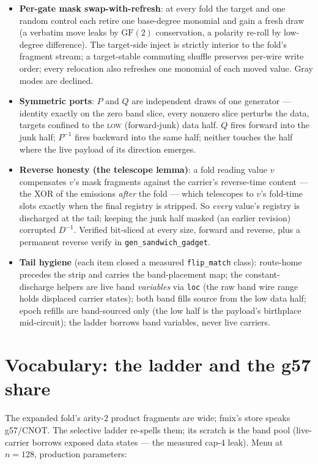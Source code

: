 \documentclass[11pt]{article}
\begin{document}
\begin{itemize}
\item \textbf{Per-gate mask swap-with-refresh}: at every fold the target
and one random control each retire one base-degree monomial and gain a
fresh draw (a verbatim move leaks by $\mathrm{GF}(2)$ conservation, a
polarity re-roll by low-degree difference). The target-side inject is
strictly interior to the fold's fragment stream; a target-stable
commuting shuffle preserves per-wire write order; every relocation also
refreshes one monomial of each moved value. Gray modes are declined.
\item \textbf{Symmetric ports}: $P$ and $Q$ are independent draws of one
generator --- identity exactly on the zero band slice, every nonzero
slice perturbs the data, targets confined to the \textsc{low}
(forward-junk) data half. $Q$ fires forward into the junk half; $P^{-1}$
fires backward into the same half; neither touches the half where the
live payload of its direction emerges.
\item \textbf{Reverse honesty (the telescope lemma)}: a fold reading
value $v$ compensates $v$'s mask fragments against the carrier's
reverse-time content --- the XOR of the emissions \emph{after} the fold
--- which telescopes to $v$'s fold-time slots exactly when the final
registry is stripped. So \emph{every} value's registry is discharged at
the tail; keeping the junk half masked (an earlier revision) corrupted
$D^{-1}$. Verified bit-sliced at every size, forward and reverse, plus a
permanent reverse verify in \texttt{gen\_sandwich\_gadget}.
\item \textbf{Tail hygiene} (each item closed a measured
\texttt{flip\_match} class): route-home precedes the strip and carries
the band-placement map; the constant-discharge helpers are live band
\emph{variables} via \texttt{loc} (the raw band wire range holds
displaced carrier states); both band fills source from the low data
half; epoch refills are band-sourced only (the low half is the payload's
birthplace mid-circuit); the ladder borrows band variables, never live
carriers.
\end{itemize}

\section{Vocabulary: the ladder and the g57 share}

The expanded fold's arity-2 product fragments are wide; fmix's store
speaks g57/CNOT. The selective ladder re-spells them; its scratch is the
band pool (live-carrier borrows exposed data states --- the measured
cap-4 leak). Menu at $n=128$, production parameters:
\end{document}
